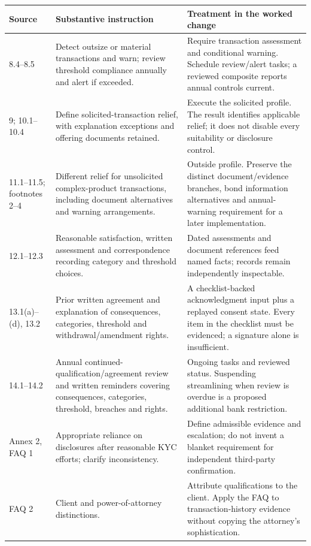 \documentclass[12pt,a4paper,oneside,openany]{book}
\begin{document}
\endgroup
\begin{longtable}{P{0.14\textwidth}P{0.37\textwidth}P{0.39\textwidth}}

\toprule Source & Substantive instruction & Treatment in the worked change \\\midrule
\endhead
8.4--8.5 & Detect outsize or material transactions and warn; review threshold compliance annually and alert if exceeded. & Require transaction assessment and conditional warning. Schedule review/alert tasks; a reviewed composite reports annual controls current.\\
9; 10.1--10.4 & Define solicited-transaction relief, with explanation exceptions and offering documents retained. & Execute the solicited profile. The result identifies applicable relief; it does not disable every suitability or disclosure control.\\
11.1--11.5; footnotes 2--4 & Different relief for unsolicited complex-product transactions, including document alternatives and warning arrangements. & Outside profile. Preserve the distinct document/evidence branches, bond information alternatives and annual-warning requirement for a later implementation.\\
12.1--12.3 & Reasonable satisfaction, written assessment and correspondence recording category and threshold choices. & Dated assessments and document references feed named facts; records remain independently inspectable.\\
13.1(a)--(d), 13.2 & Prior written agreement and explanation of consequences, categories, threshold and withdrawal/amendment rights. & A checklist-backed acknowledgment input plus a replayed consent state. Every item in the checklist must be evidenced; a signature alone is insufficient.\\
14.1--14.2 & Annual continued-qualification/agreement review and written reminders covering consequences, categories, threshold, breaches and rights. & Ongoing tasks and reviewed status. Suspending streamlining when review is overdue is a proposed additional bank restriction.\\
Annex 2, FAQ 1 & Appropriate reliance on disclosures after reasonable KYC efforts; clarify inconsistency. & Define admissible evidence and escalation; do not invent a blanket requirement for independent third-party confirmation.\\
FAQ 2 & Client and power-of-attorney distinctions. & Attribute qualifications to the client. Apply the FAQ to transaction-history evidence without copying the attorney's sophistication.\\

\end{longtable}
\end{document}
